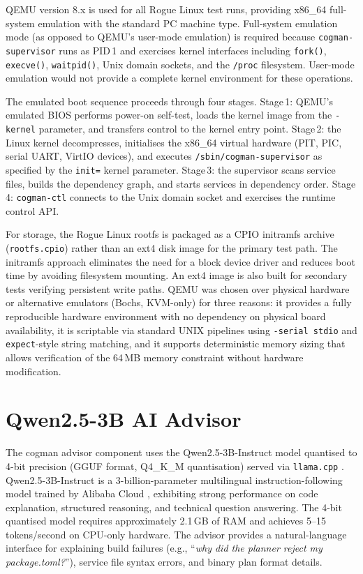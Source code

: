 \documentclass[12pt,a4paper]{report}
\begin{document}
QEMU version 8.x is used for all Rogue Linux test runs, providing x86\_64
full-system emulation with the standard PC machine type. Full-system emulation
mode (as opposed to QEMU's user-mode emulation) is required because
\texttt{cogman-supervisor} runs as PID\,1 and exercises kernel interfaces
including \texttt{fork()}, \texttt{execve()}, \texttt{waitpid()}, Unix domain
sockets, and the \texttt{/proc} filesystem. User-mode emulation would not provide
a complete kernel environment for these operations.

The emulated boot sequence proceeds through four stages. Stage\,1: QEMU's
emulated BIOS performs power-on self-test, loads the kernel image from the
\texttt{-kernel} parameter, and transfers control to the kernel entry point.
Stage\,2: the Linux kernel decompresses, initialises the x86\_64 virtual hardware
(PIT, PIC, serial UART, VirtIO devices), and executes
\texttt{/sbin/cogman-supervisor} as specified by the \texttt{init=} kernel
parameter. Stage\,3: the supervisor scans service files, builds the dependency
graph, and starts services in dependency order. Stage\,4: \texttt{cogman-ctl}
connects to the Unix domain socket and exercises the runtime control API.

For storage, the Rogue Linux rootfs is packaged as a CPIO initramfs archive
(\texttt{rootfs.cpio}) rather than an ext4 disk image for the primary test path.
The initramfs approach eliminates the need for a block device driver and reduces
boot time by avoiding filesystem mounting. An ext4 image is also built for
secondary tests verifying persistent write paths. QEMU was chosen over physical
hardware or alternative emulators (Bochs, KVM-only) for three reasons: it
provides a fully reproducible hardware environment with no dependency on physical
board availability, it is scriptable via standard UNIX pipelines using
\texttt{-serial stdio} and \texttt{expect}-style string matching, and it
supports deterministic memory sizing that allows verification of the 64\,MB memory
constraint without hardware modification.

\section{Qwen2.5-3B AI Advisor}

The cogman advisor component uses the Qwen2.5-3B-Instruct model quantised to
4-bit precision (GGUF format, Q4\_K\_M quantisation) served via
\texttt{llama.cpp} \cite{llamacpp}. Qwen2.5-3B-Instruct is a 3-billion-parameter
multilingual instruction-following model trained by Alibaba Cloud \cite{qwen},
exhibiting strong performance on code explanation, structured reasoning, and
technical question answering. The 4-bit quantised model requires approximately
2.1\,GB of RAM and achieves 5--15 tokens/second on CPU-only hardware. The advisor
provides a natural-language interface for explaining build failures (e.g.,
``\textit{why did the planner reject my package.toml?}''), service file syntax
errors, and binary plan format details.
\end{document}
